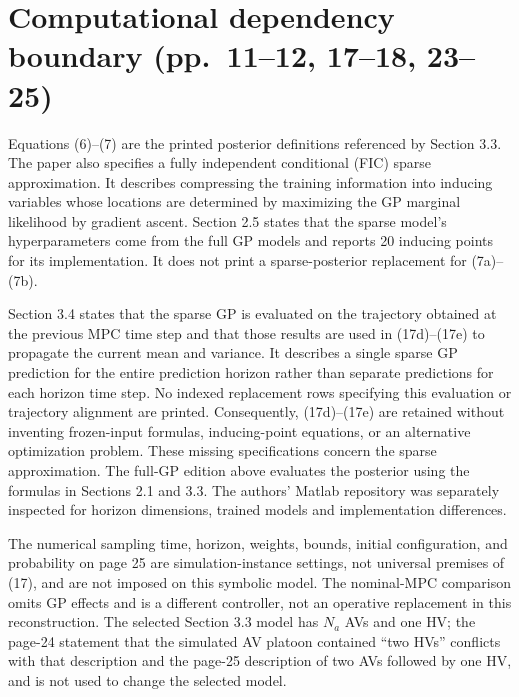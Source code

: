 \documentclass{article}
\begin{document}
\section*{Computational dependency boundary (pp.\ 11--12, 17--18, 23--25)}
Equations (6)--(7) are the printed posterior definitions referenced by Section 3.3. The paper also specifies a fully independent conditional (FIC) sparse approximation. It describes compressing the training information into inducing variables whose locations are determined by maximizing the GP marginal likelihood by gradient ascent. Section 2.5 states that the sparse model's hyperparameters come from the full GP models and reports 20 inducing points for its implementation. It does not print a sparse-posterior replacement for (7a)--(7b).

Section 3.4 states that the sparse GP is evaluated on the trajectory obtained at the previous MPC time step and that those results are used in (17d)--(17e) to propagate the current mean and variance. It describes a single sparse GP prediction for the entire prediction horizon rather than separate predictions for each horizon time step. No indexed replacement rows specifying this evaluation or trajectory alignment are printed. Consequently, (17d)--(17e) are retained without inventing frozen-input formulas, inducing-point equations, or an alternative optimization problem. These missing specifications concern the sparse approximation. The full-GP edition above evaluates the posterior using the formulas in Sections 2.1 and 3.3. The authors' Matlab repository was separately inspected for horizon dimensions, trained models and implementation differences.

The numerical sampling time, horizon, weights, bounds, initial configuration, and probability on page 25 are simulation-instance settings, not universal premises of (17), and are not imposed on this symbolic model. The nominal-MPC comparison omits GP effects and is a different controller, not an operative replacement in this reconstruction. The selected Section 3.3 model has $N_a$ AVs and one HV; the page-24 statement that the simulated AV platoon contained ``two HVs'' conflicts with that description and the page-25 description of two AVs followed by one HV, and is not used to change the selected model.
\end{document}
